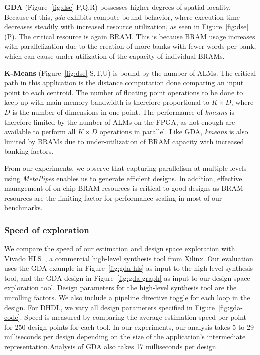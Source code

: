 \textbf{GDA} (Figure~\ref{fig:dse} P,Q,R) possesses higher degrees of spatial locality. Because of this, \emph{gda} exhibits compute-bound behavior, where execution time
decreases steadily with increased resource utilization, as seen in Figure~\ref{fig:dse}(P). The critical resource is again BRAM. This is because BRAM usage increases with parallelization due to the creation of
more banks with fewer words per bank, which can cause under-utilization of the capacity of individual BRAMs.

\textbf{K-Means} (Figure~\ref{fig:dse} S,T,U) is bound by the number of ALMs. The critical path in this application is the distance computation done comparing an input point to each centroid.
The number of floating point operations to be done to keep up with main memory bandwidth is therefore proportional to $K \times D$, where $D$ is the number of dimensions in one point.
The performance of \emph{kmeans} is therefore limited by the number of ALMs on the FPGA, as not enough are available to perform all $K \times D$ operations in parallel.
Like GDA, \emph{kmeans} is also limited by BRAMs due to under-utilization of BRAM capacity with increased banking factors.




From our experiments, we observe that capturing parallelism at multiple levels using \emph{MetaPipe}s enables us to generate
efficient designs. In addition, effective management of on-chip BRAM resources is critical to good designs
as BRAM resources are the limiting factor for performance scaling in most of our benchmarks.



\subsubsection{Speed of exploration}
We compare the speed of our estimation and design space exploration with
Vivado HLS~\cite{vivadohls}, a commercial high-level synthesis tool from Xilinx.
Our evaluation uses the GDA example in Figure~\ref{fig:gda-hls} as input to the high-level synthesis tool, and the GDA
design in Figure~\ref{fig:gda-graph} as input to our design space exploration tool. Design parameters
for the high-level synthesis tool are the unrolling factors. We also include a pipeline directive
toggle for each loop in the design. For DHDL, we vary all design parameters
specified in Figure~\ref{fig:gda-code}. Speed
is measured by comparing the average estimation speed per point for 250 design points for each tool.
In our experiments, our analysis takes 5 to 29 milliseconds per design depending on the size of the application's intermediate representation.Analysis of GDA also takes 17 milliseconds per design.

